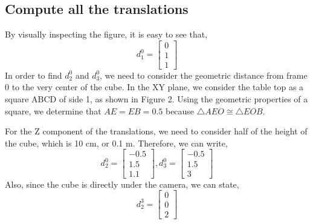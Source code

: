 \documentclass[conference]{IEEEtran}
\begin{document}
\subsection{Compute all the translations}
By visually inspecting the figure, it is easy to see that,
\[
    d^0_1 = \begin{bmatrix}
        0\\
        1\\
        1
    \end{bmatrix}
\]
In order to find $d^0_2$ and $d^0_3$, we need to consider
the geometric distance from frame 0 to the very center of the cube.
In the XY plane, we consider the table top as a square ABCD of side 1,
as shown in Figure 2. Using the geometric properties of a square, we
determine that $AE = EB = 0.5$ because $\triangle AEO \cong \triangle EOB$.

For the Z component of the translations, we need to consider half of the height
of the cube, which is 10 cm, or 0.1 m. Therefore, we can write,
\[
    d^0_2 = \begin{bmatrix}
        -0.5\\
        1.5\\
        1.1
    \end{bmatrix},
    d^0_3 = \begin{bmatrix}
        -0.5\\
        1.5\\
        3
    \end{bmatrix}
\]
Also, since the cube is directly under the camera, we can state,
\[
    d^3_2 = \begin{bmatrix}
        0\\
        0\\
        2
    \end{bmatrix}
\]
\vspace{0.1in}
\end{document}
